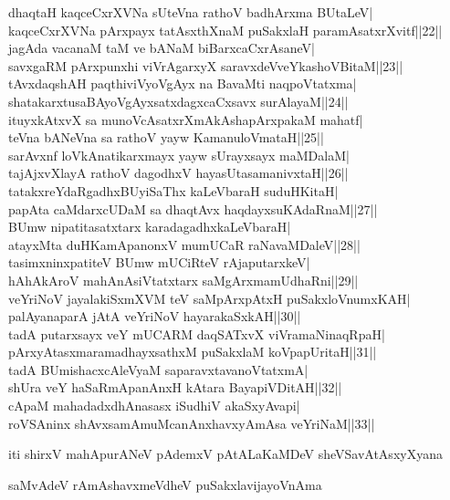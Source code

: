 \documentclass{article}
\begin{document}
dhaqtaH kaqceCxrXVNa sUteVna rathoV badhArxma BUtaLeV|\\
kaqceCxrXVNa pArxpayx tatAsxthXnaM puSakxlaH paramAsatxrXvitf||22||\\
jagAda vacanaM taM ve bANaM biBarxcaCxrAsaneV|\\
savxgaRM pArxpunxhi viVrAgarxyX saravxdeVveYkashoVBitaM||23||\\
tAvxdaqshAH paqthiviVyoVgAyx na BavaMti naqpoVtatxma|\\
shatakarxtusaBAyoVgAyxsatxdagxcaCxsavx surAlayaM||24||\\
ituyxkAtxvX sa munoVcAsatxrXmAkAshapArxpakaM mahatf|\\
teVna bANeVna sa rathoV yayw KamanuloVmataH||25||\\
sarAvxnf loVkAnatikarxmayx yayw sUrayxsayx maMDalaM|\\
tajAjxvXlayA rathoV dagodhxV hayasUtasamanivxtaH||26||\\
tatakxreYdaRgadhxBUyiSaThx kaLeVbaraH suduHKitaH|\\
papAta caMdarxcUDaM sa dhaqtAvx haqdayxsuKAdaRnaM||27||\\
BUmw nipatitasatxtarx karadagadhxkaLeVbaraH|\\
atayxMta duHKamApanonxV mumUCaR raNavaMDaleV||28||\\
tasimxninxpatiteV BUmw mUCiRteV rAjaputarxkeV|\\
hAhAkAroV mahAnAsiVtatxtarx saMgArxmamUdhaRni||29||\\
veYriNoV jayalakiSxmXVM teV saMpArxpAtxH puSakxloVnumxKAH|\\
palAyanaparA jAtA veYriNoV hayarakaSxkAH||30||\\
tadA putarxsayx veY mUCARM daqSATxvX viVramaNinaqRpaH|\\
pArxyAtasxmaramadhayxsathxM puSakxlaM koVpapUritaH||31||\\
tadA BUmishacxcAleVyaM saparavxtavanoVtatxmA|\\
shUra veY haSaRmApanAnxH kAtara BayapiVDitAH||32||\\
cApaM mahadadxdhAnasasx iSudhiV akaSxyAvapi|\\
roVSAninx shAvxsamAmuMcanAnxhavxyAmAsa veYriNaM||33||

\begin{center}
iti shirxV mahApurANeV pAdemxV pAtALaKaMDeV sheVSavAtAsxyXyana
\end{center}

\begin{center}
saMvAdeV rAmAshavxmeVdheV puSakxlavijayoVnAma
\end{center}
\end{document}

